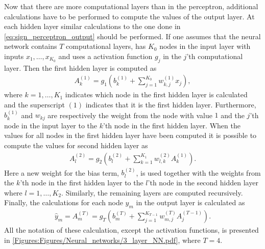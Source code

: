 Now that there are more computational layers than in the perceptron, additional calculations have to be performed to compute the values of the output layer. At each hidden layer similar calculations to the one done in \eqref{eq:sign_perceptron_output} should be performed. If one assumes that the neural network contains $T$ computational layers, has $K_0$ nodes in the input layer with inputs $x_1,\ldots, x_{K_0}$ and uses a activation function $g_j$ in the $j$'th computational layer. Then the first hidden layer is computed as
\begin{align*}
    A^{(1)}_k = g_1\left(b_{k}^{(1)} + \sum_{j=1}^{K_0} w_{k,j}^{(1)}x_j\right),
\end{align*}
where $k = 1,\ldots,K_1$ indicates which node in the first hidden layer is calculated and the superscript $(1)$ indicates that it is the first hidden layer. Furthermore, $b_{k}^{(1)}$ and $w_{kj}$ are respectively the weight from the node with value $1$ and the $j$'th node in the input layer to the $k$'th node in the first hidden layer. When the values for all nodes in the first hidden layer have been computed it is possible to compute the values for second hidden layer as
\begin{align*}
    A^{(2)}_l = g_2\left(b_{l}^{(2)} + \sum_{k=1}^{K_1} w_{l,k}^{(2)}A_k^{(1)}\right).
\end{align*}
Here a new weight for the bias term, $b_{l}^{(2)}$, is used together with the weights from the $k$'th node in the first hidden layer to the $l$'th node in the second hidden layer where $l = 1,\ldots, K_2$. Similarly, the remaining layers are computed recursively. Finally, the calculations for each node $\hat{y}_m$ in the output layer is calculated as
\begin{align*}
    \hat{y}_m = A^{(T)}_m = g_T\left(b_{m}^{(T)} + \sum_{j=1}^{K_{T-1}} w_{m,j}^{(T)}A_j^{(T-1)}\right).
\end{align*}
All the notation of these calculation, except the activation functions, is presented in \autoref{Figures:Figures/Neural_networks/3_layer_NN.pdf}, where $T = 4$. 

